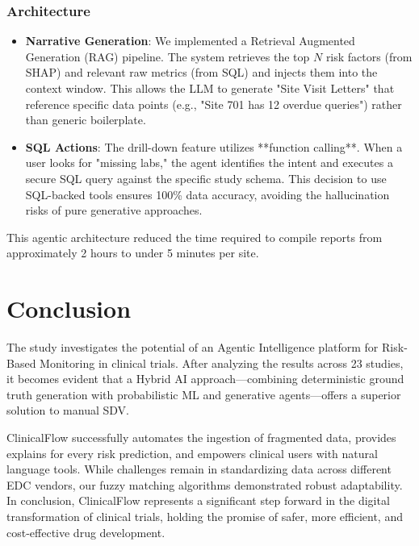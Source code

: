 \documentclass[conference]{IEEEtran}
\begin{document}
\subsubsection{\textbf{Architecture}}
\begin{itemize}
    \item \textbf{Narrative Generation}: We implemented a Retrieval Augmented Generation (RAG) pipeline. The system retrieves the top $N$ risk factors (from SHAP) and relevant raw metrics (from SQL) and injects them into the context window. This allows the LLM to generate "Site Visit Letters" that reference specific data points (e.g., "Site 701 has 12 overdue queries") rather than generic boilerplate.
    \item \textbf{SQL Actions}: The drill-down feature utilizes **function calling**. When a user looks for "missing labs," the agent identifies the intent and executes a secure SQL query against the specific study schema. This decision to use SQL-backed tools ensures 100\% data accuracy, avoiding the hallucination risks of pure generative approaches.
\end{itemize}
This agentic architecture reduced the time required to compile reports from approximately 2 hours to under 5 minutes per site.

\section{Conclusion}
The study investigates the potential of an Agentic Intelligence platform for Risk-Based Monitoring in clinical trials. After analyzing the results across 23 studies, it becomes evident that a Hybrid AI approach—combining deterministic ground truth generation with probabilistic ML and generative agents—offers a superior solution to manual SDV.

ClinicalFlow successfully automates the ingestion of fragmented data, provides explains for every risk prediction, and empowers clinical users with natural language tools. While challenges remain in standardizing data across different EDC vendors, our fuzzy matching algorithms demonstrated robust adaptability. In conclusion, ClinicalFlow represents a significant step forward in the digital transformation of clinical trials, holding the promise of safer, more efficient, and cost-effective drug development.


\vspace{12pt}
\end{document}
